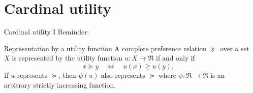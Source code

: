 \documentclass[bigger]{beamer}
\begin{document}
\section{Cardinal utility}
\label{sec:orgcc9060c}
\begin{frame}[label={sec:org8227f98}]{Cardinal utility I}
Reminder:
\begin{block}{Representation by a utility function}
A complete preference relation \(\succeq\) over a set \(X\) is represented by the utility function \(u:X\rightarrow\Re\) if and only if
$$x\succeq y \quad\Leftrightarrow\quad u(x)\geq u(y).$$
If \(u\) represents \(\succeq\), then \(\psi(u)\) also represents \(\succeq\) where \(\psi:\Re\rightarrow\Re\) is an arbitrary strictly increasing function.
\end{block}
\end{frame}
\end{document}
